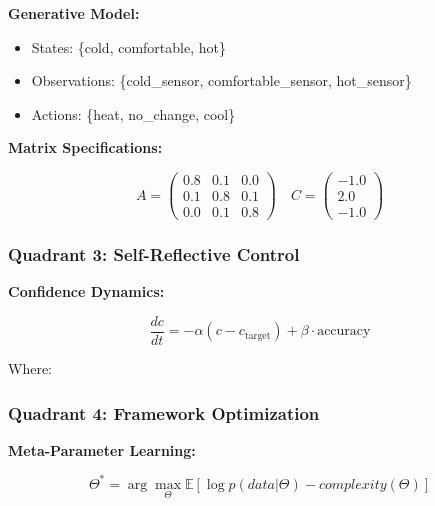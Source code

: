 \documentclass[
]{article}
\providecommand{\tightlist}{%
  \setlength{\itemsep}{0pt}\setlength{\parskip}{0pt}}
\begin{document}
\textbf{Generative Model:}

\begin{itemize}
\tightlist
\item
  States: \{cold, comfortable, hot\}
\item
  Observations: \{cold\_sensor, comfortable\_sensor, hot\_sensor\}
\item
  Actions: \{heat, no\_change, cool\}
\end{itemize}

\textbf{Matrix Specifications:}

\[A = \begin{pmatrix}
0.8 & 0.1 & 0.0 \\
0.1 & 0.8 & 0.1 \\
0.0 & 0.1 & 0.8
\end{pmatrix} \quad C = \begin{pmatrix} -1.0 \\ 2.0 \\ -1.0 \end{pmatrix}\]

\subsubsection{Quadrant 3: Self-Reflective
Control}\label{quadrant-3-self-reflective-control}

\textbf{Confidence Dynamics:}

\[\frac{dc}{dt} = -\alpha (c - c_{\text{target}}) + \beta \cdot \text{accuracy}\]

Where:


\subsubsection{Quadrant 4: Framework
Optimization}\label{quadrant-4-framework-optimization}

\textbf{Meta-Parameter Learning:}

\[\Theta^* = \arg\max_{\Theta} \mathbb{E}[\log p(data|\Theta) - complexity(\Theta)]\]
\end{document}
